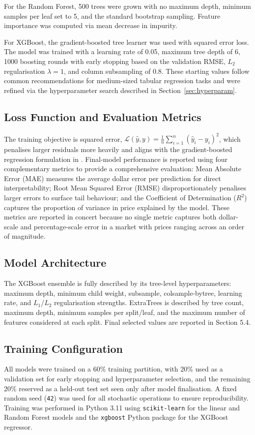 \documentclass[a4paper,12pt]{article}
\begin{document}
For the Random Forest, 500 trees were grown with no maximum depth, minimum samples per leaf set to 5, and the standard bootstrap sampling. Feature importance was computed via mean decrease in impurity.

For XGBoost, the gradient-boosted tree learner was used with squared error loss. The model was trained with a learning rate of 0.05, maximum tree depth of 6, 1000 boosting rounds with early stopping based on the validation RMSE, $L_2$ regularisation $\lambda = 1$, and column subsampling of 0.8. These starting values follow common recommendations for medium-sized tabular regression tasks \cite{chen2016xgboost} and were refined via the hyperparameter search described in Section~\ref{sec:hyperparam}.

\subsection{Loss Function and Evaluation Metrics}
The training objective is squared error, $\mathcal{L}(\hat{y}, y) = \frac{1}{n}\sum_{i=1}^{n}\left(\hat{y}_i - y_i\right)^2$, which penalises larger residuals more heavily and aligns with the gradient-boosted regression formulation in \cite{chen2016xgboost}. Final-model performance is reported using four complementary metrics to provide a comprehensive evaluation: Mean Absolute Error (MAE) measures the average dollar error per prediction for direct interpretability; Root Mean Squared Error (RMSE) disproportionately penalises larger errors to surface tail behaviour; and the Coefficient of Determination ($R^2$) captures the proportion of variance in price explained by the model. These metrics are reported in concert because no single metric captures both dollar-scale and percentage-scale error in a market with prices ranging across an order of magnitude.

\subsection{Model Architecture}
The XGBoost ensemble is fully described by its tree-level hyperparameters: maximum depth, minimum child weight, subsample, colsample-bytree, learning rate, and $L_1$/$L_2$ regularisation strengths. ExtraTrees is described by tree count, maximum depth, minimum samples per split/leaf, and the maximum number of features considered at each split. Final selected values are reported in Section 5.4.

\subsection{Training Configuration}
All models were trained on a 60\% training partition, with 20\% used as a validation set for early stopping and hyperparameter selection, and the remaining 20\% reserved as a held-out test set seen only after model finalisation. A fixed random seed (\texttt{42}) was used for all stochastic operations to ensure reproducibility. Training was performed in Python 3.11 using \texttt{scikit-learn} \cite{pedregosa2011sklearn} for the linear and Random Forest models and the \texttt{xgboost} Python package \cite{xgboost2023docs} for the XGBoost regressor.
\end{document}
